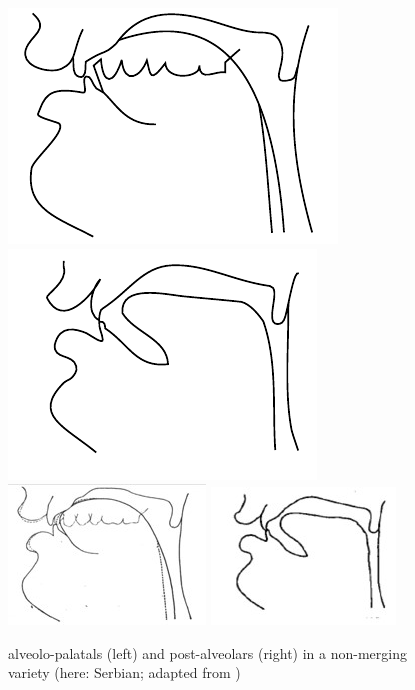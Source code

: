 \documentclass[output=paper,modfonts,nonflat,
]{langsci/langscibook}
\begin{document}
\begin{figure}
\includegraphics[width=.45\textwidth]{figures/MCFigure2left.pdf}
\includegraphics[width=.45\textwidth]{figures/MCFigure2right.pdf}\\

\includegraphics[width=.45\textwidth]{figures/MCFigure2left.jpg}
\includegraphics[width=.45\textwidth]{figures/MCFigure2right.jpg}
\caption{\label{fig:mihajlovic:2} alveolo-palatals (left) and post-alveolars (right) in a non-merging variety (here: Serbian; adapted from \citealt{Miletić1958})}
\end{figure}
\end{document}
